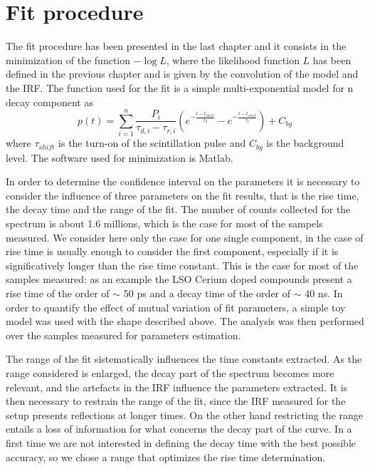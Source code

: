 \section{Fit procedure}
The fit procedure has been presented in the last chapter and it consists in the minimization of the function $-\log{L}$, where the likelihood function $L$ has been defined in the previous chapter and is given by the convolution of the model and the IRF.
The function used for the fit is a simple multi-exponential model for n decay component as
\begin{equation}
p(t) = \sum _{i = 1}^{n} \frac{P_{i}}{\tau _{d, i} - \tau _{r, i}}\left( e^{-\frac{t-t_{shift}}{\tau _{d}}} - e^{-\frac{t-t_{shift}}{\tau _{r}}} \right) + C_{bg}
\end{equation}
where $\tau _{shift}$ is the turn-on of the scintillation pulse and $C_{bg}$ is the background level.
The software used for minimization is Matlab.

In order to determine the confidence interval on the parameters it is necessary to consider the influence of three parameters on the fit results, that is the rise time, the decay time and the range of the fit. 
The number of counts collected for the spectrum is about 1.6 millions, which is the case for most of the sampels measured. 
We consider here only the case for one single component, in the case of rise time is usually enough to consider the first component, especially if it is significatively longer than the rise time constant. This is the case for most of the samples measured: as an example the LSO Cerium doped compounds present a rise time of the order of $\sim$ 50 ps and a decay time of the order of $\sim$ 40 ns.
In order to quantify the effect of mutual variation of fit parameters, a simple toy model was used with the shape described above. The analysis was then performed over the samples measured for parameters estimation.

The range of the fit sistematically influences the time constants extracted. As the range considered is enlarged, the  decay part of the spectrum becomes more relevant, and the artefacts in the IRF influence the parameters extracted. 
It is then necessary to restrain the range of the fit, since the IRF measured for the setup presents reflections at longer times. On the other hand restricting the range  entails a loss of information for what concerns the decay part of the curve. In a first time we are not interested in defining the decay time with the best possible accuracy, so we chose a range that optimizes the rise time determination.


